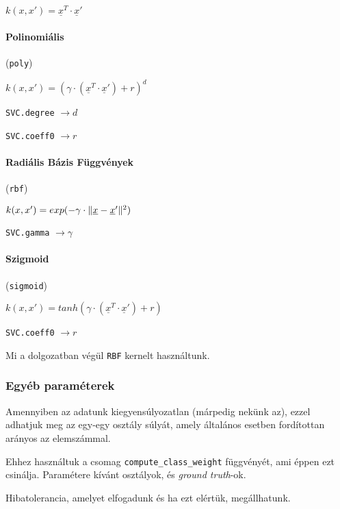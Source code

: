 $ k(x, x') = \underline{x}^T \cdot \underline{x}' $


\paragraph{Polinomiális} (\texttt{poly})

$ k(x, x') = (\gamma \cdot (\underline{x}^T \cdot \underline{x}') + r)^d $

\texttt{SVC.degree} $ \rightarrow d $

\texttt{SVC.coeff0} $ \rightarrow r $

\paragraph{Radiális Bázis Függvények} (\texttt{rbf})


$ k(x, x') = exp( - \gamma \cdot \lVert\underline{x} - \underline{x}'\rVert^2) $

\texttt{SVC.gamma} $ \rightarrow \gamma $




\paragraph{Szigmoid} (\texttt{sigmoid})

$ k(x, x') = tanh(\gamma \cdot (\underline{x}^T \cdot \underline{x}') + r) $

\texttt{SVC.coeff0} $ \rightarrow r $


\noindent
Mi a dolgozatban végül \texttt{RBF} kernelt használtunk.

\subsubsection{Egyéb paraméterek}

Amennyiben az adatunk kiegyensúlyozatlan (márpedig nekünk az), ezzel adhatjuk meg
az egy-egy osztály súlyát, amely általános esetben fordítottan arányos az elemszámmal.

Ehhez használtuk a csomag \texttt{compute\_class\_weight} függvényét, ami éppen ezt csinálja.
Paramétere  kívánt osztályok, és \textit{ground truth}-ok.


Hibatolerancia, amelyet elfogadunk és ha ezt elértük, megállhatunk.




